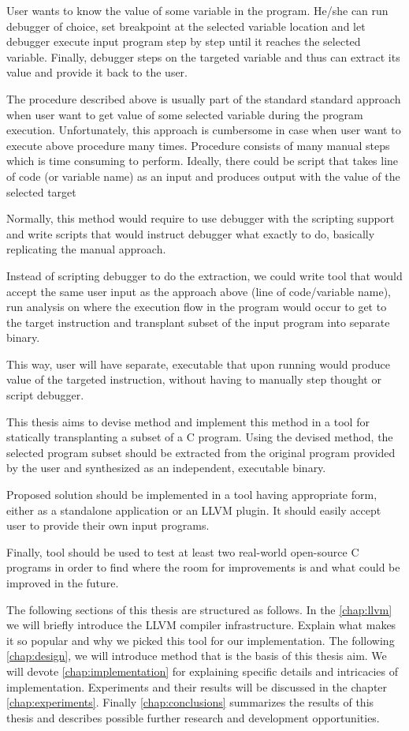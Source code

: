 \documentclass[12pt, twoside]{fithesis2}
\renewcommand{\_}{\leavevmode \kern0.07em\vbox{\hrule width0.4em}}
\begin{document}
User wants to know the value of some variable in the program. He/she can run
debugger of choice, set breakpoint at the selected variable location and let
debugger execute input program step by step until it reaches the selected
variable. Finally, debugger steps on the targeted variable and thus can extract
its value and provide it back to the user.

The procedure described above is usually part of the standard standard approach
when user want to get value of some selected variable during the program
execution. Unfortunately, this approach is cumbersome in case when user want to
execute above procedure many times. Procedure consists of many manual steps
which is time consuming to perform. Ideally, there could be script that takes
line of code (or variable name) as an input and produces output with the value
of the selected target

Normally, this method would require to use debugger with the scripting support
and write scripts that would instruct debugger what exactly to do, basically
replicating the manual approach.

Instead of scripting debugger to do the extraction, we could write tool that
would accept the same user input as the approach above (line of code/variable
name), run analysis on where the execution flow in the program would occur to
get to the target instruction and transplant subset of the input program into
separate binary.

This way, user will have separate, executable that upon running would produce
value of the targeted instruction, without having to manually step thought or
script debugger.

This thesis aims to devise method and implement this method in a tool for
statically transplanting a subset of a C program. Using the devised method, the
selected program subset should be extracted from the original program provided
by the user and synthesized as an independent, executable binary.

Proposed solution should be implemented in a tool having appropriate form,
either as a standalone application or an LLVM plugin. It should easily accept
user to provide their own input programs.

Finally, tool should be used to test at least two real-world open-source C
programs in order to find where the room for improvements is and what could be
improved in the future.



The following sections of this thesis are structured as follows.
In the \autoref{chap:llvm} we will briefly introduce the LLVM compiler
infrastructure.  Explain what makes it so popular and why we picked this tool
for our implementation.
The following \autoref{chap:design}, we will introduce method that is the basis
of this thesis aim.
We will devote \autoref{chap:implementation} for explaining specific details
and intricacies of implementation.
Experiments and their results will be discussed in the chapter
\autoref{chap:experiments}. Finally \autoref{chap:conclusions} summarizes the
results of this thesis and describes possible further research and development
opportunities.
\end{document}
